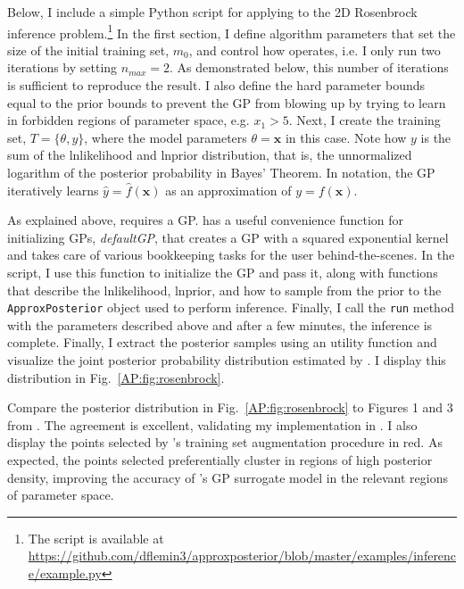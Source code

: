 Below, I include a simple Python script for applying \approxposterior to the 2D Rosenbrock inference problem.\footnote{The script is available at \href{https://github.com/dflemin3/approxposterior/blob/master/examples/inference/example.py}{https://github.com/dflemin3/approxposterior/blob/master/examples/inference/example.py}} In the first section, I define algorithm parameters that set the size of the initial training set, $m_0$, and control how \approxposterior operates, i.e. I only run two iterations by setting $n_{max} = 2$. As demonstrated below, this number of iterations is sufficient to reproduce the \citet{Wang2018} result. I also define the hard parameter bounds equal to the prior bounds to prevent the GP from blowing up by trying to learn in forbidden regions of parameter space, e.g. $x_1 > 5$. Next, I create the training set, $T = \{ \theta, y \}$, where the model parameters $\theta = \textbf{x}$ in this case. Note how $y$ is the sum of the lnlikelihood and lnprior distribution, that is, the unnormalized logarithm of the posterior probability in Bayes' Theorem. In \approxposterior notation, the GP iteratively learns $\hat{y} = \hat{f}(\textbf{x})$ as an approximation of $y = f(\textbf{x})$.

As explained above, \approxposterior requires a GP. \approxposterior has a useful convenience function for initializing GPs, \textit{defaultGP}, that creates a GP with a squared exponential kernel and takes care of various bookkeeping tasks for the user behind-the-scenes. In the script, I use this function to initialize the GP and pass it, along with functions that describe the lnlikelihood, lnprior, and how to sample from the prior to the \texttt{ApproxPosterior} object used to perform inference. Finally, I call the \approxposterior \texttt{run} method with the parameters described above and after a few minutes, the inference is complete. Finally, I extract the posterior samples using an \emcee utility function and visualize the joint posterior probability distribution estimated by \approxposterior. I display this distribution in Fig.~\ref{AP:fig:rosenbrock}. 


Compare the posterior distribution in Fig.~\ref{AP:fig:rosenbrock} to Figures 1 and 3 from \citet{Wang2018}. The agreement is excellent, validating my implementation in \approxposterior. I also display the points selected by \approxposterior's training set augmentation procedure in red. As expected, the points \approxposterior selected preferentially cluster in regions of high posterior density, improving the accuracy of \approxposterior's GP surrogate model in the relevant regions of parameter space.


